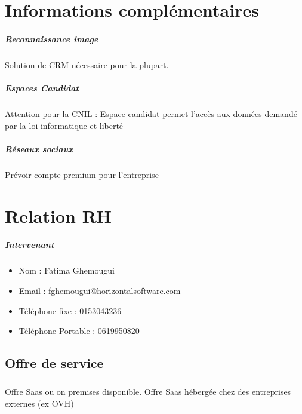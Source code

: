 \documentclass[12pt,twoside]{scrreprt}
\date{Avril 2016}
\author{Direction des opérations}
\begin{document}
\initIngeniance


% 

\tableofcontents

\chapter*{Informations complémentaires}
\paragraph{Reconnaissance image} Solution de CRM nécessaire pour la plupart.
\paragraph{Espaces Candidat} Attention pour la CNIL : Espace candidat permet l'accès aux données demandé par la loi informatique et liberté 
\paragraph{Réseaux sociaux} Prévoir compte premium pour l'entreprise

\chapter{Relation RH}


\paragraph{Intervenant}
\begin{itemize}
	\item Nom : Fatima Ghemougui
	\item Email : fghemougui@horizontalsoftware.com
	\item Téléphone fixe : 0153043236
	\item Téléphone Portable : 0619950820  
\end{itemize}

\section{Offre de service}
\paragraph{} Offre Saas ou on premises disponible. Offre Saas hébergée chez des entreprises externes (ex OVH)
\end{document}
